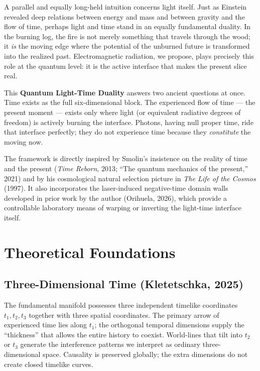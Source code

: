 \documentclass[11pt,a4paper]{article}
\begin{document}
A parallel and equally long-held intuition concerns light itself. Just as Einstein revealed deep relations between energy and mass and between gravity and the flow of time, perhaps light and time stand in an equally fundamental duality. In the burning log, the fire is not merely something that travels through the wood; it \textit{is} the moving edge where the potential of the unburned future is transformed into the realized past. Electromagnetic radiation, we propose, plays precisely this role at the quantum level: it is the active interface that makes the present slice real.

This \textbf{Quantum Light-Time Duality} answers two ancient questions at once. Time exists as the full six-dimensional block. The experienced flow of time — the present moment — exists only where light (or equivalent radiative degrees of freedom) is actively burning the interface. Photons, having null proper time, ride that interface perfectly; they do not experience time because they \textit{constitute} the moving now.

The framework is directly inspired by Smolin's insistence on the reality of time and the present (\textit{Time Reborn}, 2013; ``The quantum mechanics of the present,'' 2021) and by his cosmological natural selection picture in \textit{The Life of the Cosmos} (1997). It also incorporates the laser-induced negative-time domain walls developed in prior work by the author (Orihuela, 2026), which provide a controllable laboratory means of warping or inverting the light-time interface itself.

\section{Theoretical Foundations}

\subsection{Three-Dimensional Time (Kletetschka, 2025)}
The fundamental manifold possesses three independent timelike coordinates $t_1, t_2, t_3$ together with three spatial coordinates. The primary arrow of experienced time lies along $t_1$; the orthogonal temporal dimensions supply the ``thickness'' that allows the entire history to coexist. World-lines that tilt into $t_2$ or $t_3$ generate the interference patterns we interpret as ordinary three-dimensional space. Causality is preserved globally; the extra dimensions do not create closed timelike curves.
\end{document}
